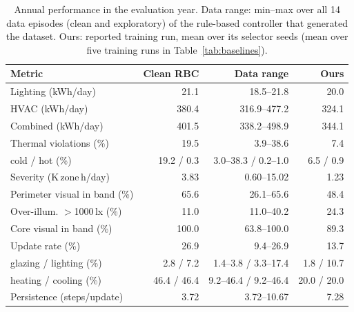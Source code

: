 \begin{table}[t]
\caption{Annual performance in the evaluation year. Data range: min--max over all 14 data episodes (clean and exploratory) of the rule-based controller that generated the dataset. Ours: reported training run, mean over its selector seeds (mean over five training runs in Table~\ref{tab:baselines}).}
\label{tab:main}
\small
\setlength{\tabcolsep}{2.2pt}
\begin{tabular}{@{}lrrr@{}}
\toprule
Metric & Clean RBC & Data range & Ours \\
\midrule
Lighting (kWh/day) & 21.1 & 18.5--21.8 & 20.0 \\
HVAC (kWh/day) & 380.4 & 316.9--477.2 & 324.1 \\
Combined (kWh/day) & 401.5 & 338.2--498.9 & 344.1 \\
\addlinespace[2pt]
Thermal violations (\%) & 19.5 & 3.9--38.6 & 7.4 \\
\quad cold / hot (\%) & 19.2 / 0.3 & 3.0--38.3 / 0.2--1.0 & 6.5 / 0.9 \\
Severity (K\,zone\,h/day) & 3.83 & 0.60--15.02 & 1.23 \\
\addlinespace[2pt]
Perimeter visual in band (\%) & 65.6 & 26.1--65.6 & 48.4 \\
Over-illum. $>$1000\,lx (\%) & 11.0 & 11.0--40.2 & 24.3 \\
Core visual in band (\%) & 100.0 & 63.8--100.0 & 89.3 \\
\addlinespace[2pt]
Update rate (\%) & 26.9 & 9.4--26.9 & 13.7 \\
\quad glazing / lighting (\%) & 2.8 / 7.2 & 1.4--3.8 / 3.3--17.4 & 1.8 / 10.7 \\
\quad heating / cooling (\%) & 46.4 / 46.4 & 9.2--46.4 / 9.2--46.4 & 20.0 / 20.0 \\
Persistence (steps/update) & 3.72 & 3.72--10.67 & 7.28 \\
\bottomrule
\end{tabular}
\end{table}
